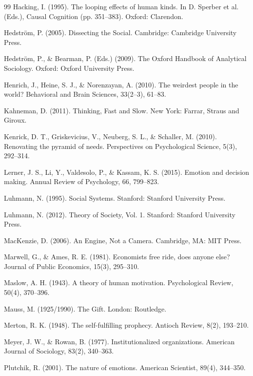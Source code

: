 \documentclass[12pt,a4paper]{article}
\begin{document}
\begin{thebibliography}{99}
 Hacking, I. (1995). The looping effects of human kinds. In D. Sperber et al. (Eds.), Causal Cognition (pp. 351--383). Oxford: Clarendon.

 Hedström, P. (2005). Dissecting the Social. Cambridge: Cambridge University Press.

 Hedström, P., \& Bearman, P. (Eds.) (2009). The Oxford Handbook of Analytical Sociology. Oxford: Oxford University Press.

 Henrich, J., Heine, S. J., \& Norenzayan, A. (2010). The weirdest people in the world? Behavioral and Brain Sciences, 33(2--3), 61--83.

 Kahneman, D. (2011). Thinking, Fast and Slow. New York: Farrar, Straus and Giroux.

 Kenrick, D. T., Griskevicius, V., Neuberg, S. L., \& Schaller, M. (2010). Renovating the pyramid of needs. Perspectives on Psychological Science, 5(3), 292--314.

 Lerner, J. S., Li, Y., Valdesolo, P., \& Kassam, K. S. (2015). Emotion and decision making. Annual Review of Psychology, 66, 799--823.

 Luhmann, N. (1995). Social Systems. Stanford: Stanford University Press.

 Luhmann, N. (2012). Theory of Society, Vol. 1. Stanford: Stanford University Press.

 MacKenzie, D. (2006). An Engine, Not a Camera. Cambridge, MA: MIT Press.

 Marwell, G., \& Ames, R. E. (1981). Economists free ride, does anyone else? Journal of Public Economics, 15(3), 295--310.

 Maslow, A. H. (1943). A theory of human motivation. Psychological Review, 50(4), 370--396.

 Mauss, M. (1925/1990). The Gift. London: Routledge.

 Merton, R. K. (1948). The self-fulfilling prophecy. Antioch Review, 8(2), 193--210.

 Meyer, J. W., \& Rowan, B. (1977). Institutionalized organizations. American Journal of Sociology, 83(2), 340--363.

 Plutchik, R. (2001). The nature of emotions. American Scientist, 89(4), 344--350.


\end{thebibliography}
\end{document}
